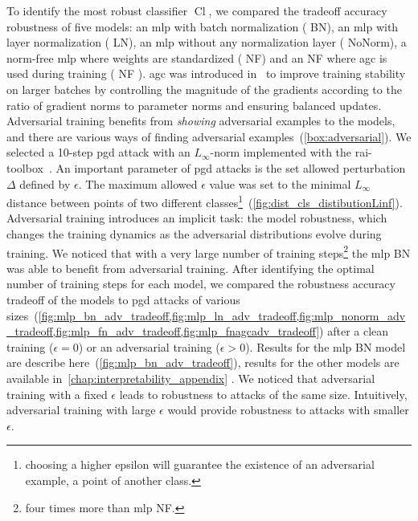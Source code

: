 \documentclass[../main.tex]{subfiles}
\begin{document}
		To identify the most robust classifier \(\operatorname{Cl}\), we compared the tradeoff accuracy robustness of five models: an \gls{mlp} with batch normalization ( BN), an \gls{mlp} with layer normalization ( LN), an \gls{mlp} without any normalization layer ( NoNorm), a norm-free \gls{mlp} where weights are standardized ( NF) and an  NF where \gls{agc} is used during training ( NF ).
		\Gls{agc} was introduced in~\cite{NoNormApplied} to improve training stability on larger batches by controlling the magnitude of the gradients according to the ratio of gradient norms to parameter norms and ensuring balanced updates.
		Adversarial training benefits from \textit{showing} adversarial examples to the models, and there are various ways of finding adversarial examples~(\cref{box:adversarial}).
		We selected a 10-step \gls{pgd} attack with an \(L_{\infty}\)-norm implemented with the {\sourcecode rai-toolbox}~\cite{soklaski2022toolspracticesresponsibleai}.
		An important parameter of \gls{pgd} attacks is the set allowed perturbation \(\Delta\) defined by \(\epsilon\).
		The maximum allowed \(\epsilon\) value was set to the minimal \(L_{\infty}\) distance between points of two different classes\footnote{choosing a higher epsilon will guarantee the existence of an adversarial example, \ie{} a point of another class.}~(\cref{fig:dist_cls_distibutionLinf}).
		Adversarial training introduces an implicit task: the model robustness, which changes the training dynamics as the adversarial distributions evolve during training.
		We noticed that with a very large number of training steps\footnote{four times more than \gls{mlp} NF.} the \gls{mlp} BN was able to benefit from adversarial training.
		After identifying the optimal number of training steps for each model, we compared the robustness accuracy tradeoff of the models to \gls{pgd} attacks of various sizes~(\cref{fig:mlp_bn_adv_tradeoff,fig:mlp_ln_adv_tradeoff,fig:mlp_nonorm_adv_tradeoff,fig:mlp_fn_adv_tradeoff,fig:mlp_fnagcadv_tradeoff}) after a clean training (\(\epsilon = 0\)) or an adversarial training (\(\epsilon > 0\)).
		Results for the \gls{mlp} BN model are describe here~(\cref{fig:mlp_bn_adv_tradeoff}), results for the other models  are available in~\cref{chap:interpretability_appendix} .
		We noticed that adversarial training with a fixed \(\epsilon\) leads to robustness to attacks of the same size.
		Intuitively, adversarial training with large \(\epsilon\) would provide robustness to attacks with smaller \(\epsilon\).
\end{document}
